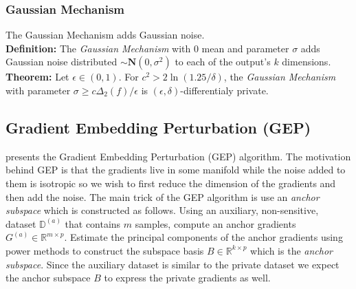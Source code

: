 \subsubsection{Gaussian Mechanism}
The Gaussian Mechanism adds Gaussian noise. \\
\textbf{Definition:} The \textit{Gaussian Mechanism} with 0 mean and parameter $\sigma$ adds Gaussian noise distributed $\sim \mathbf{N}(0,\sigma^{2})$ to each of the output's $k$ dimensions.\\
\textbf{Theorem:} Let $\epsilon \in (0,1)$. For $c^{2} > 2 \ln(1.25/\delta)$, the \textit{Gaussian Mechanism} with parameter $\sigma \geq c\Delta_{2}(f)/\epsilon$ is $(\epsilon, \delta)$-differentialy private.

\subsection{Gradient Embedding Perturbation (GEP)}
\label{GEP}
\cite{Yu2021DoLearning} presents the Gradient Embedding Perturbation (GEP) algorithm. The motivation behind GEP is that the gradients live in some manifold while the noise added to them is isotropic so we wish to first reduce the dimension of the gradients and then add the noise. The main trick of the GEP algorithm is use an \textit{anchor subspace} which is constructed as follows. Using an auxiliary, non-sensitive, dataset $\mathbb{D}^{(a)}$ that contains $m$ samples, compute an anchor gradients $G^{(a)} \in \mathbb{R}^{m \times p}$. Estimate the principal components of the anchor gradients using power methods to construct the subspace basis $B \in \mathbb{R}^{k \times p}$ which is the \textit{anchor subspace}. Since the auxiliary dataset is similar to the private dataset we expect the anchor subspace $B$ to express the private gradients as well. 

